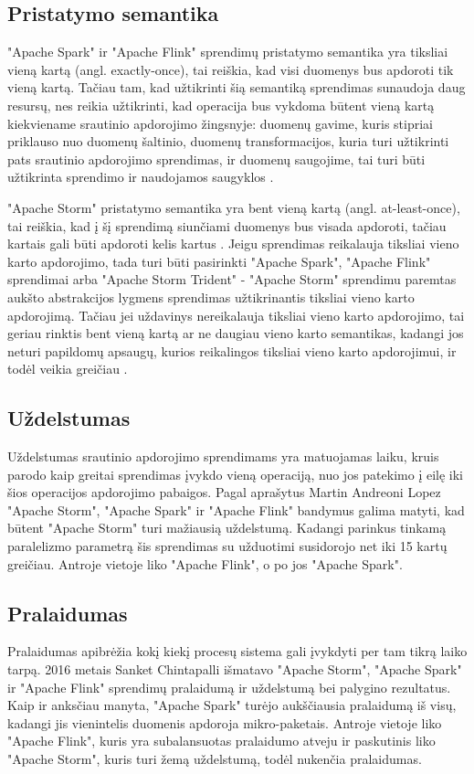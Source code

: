 \documentclass{VUMIFPSkursinis}
\begin{document}
\subsection{Pristatymo semantika}
"Apache Spark" ir "Apache Flink" sprendimų pristatymo semantika yra tiksliai vieną kartą (angl. exactly-once), tai reiškia, kad visi 
duomenys bus apdoroti tik vieną kartą. Tačiau tam, kad užtikrinti šią semantiką sprendimas sunaudoja daug resursų, nes reikia užtikrinti, kad 
operacija bus vykdoma būtent vieną kartą kiekviename srautinio apdorojimo žingsnyje: duomenų gavime, kuris stipriai priklauso nuo duomenų šaltinio,
duomenų transformacijos, kuria turi užtikrinti pats srautinio apdorojimo sprendimas, ir duomenų saugojime, tai turi būti užtikrinta sprendimo ir
naudojamos saugyklos \cite{zhang20}.\par
    "Apache Storm" pristatymo semantika yra bent vieną kartą (angl. at-least-once), tai reiškia, kad į šį sprendimą siunčiami duomenys 
bus visada apdoroti, tačiau kartais gali būti apdoroti kelis kartus \cite{prithi20}. Jeigu sprendimas reikalauja tiksliai vieno karto apdorojimo, tada turi būti pasirinkti
"Apache Spark", "Apache Flink" sprendimai arba "Apache Storm Trident" - "Apache Storm" sprendimu paremtas aukšto abstrakcijos lygmens sprendimas 
užtikrinantis tiksliai vieno karto apdorojimą. Tačiau jei uždavinys nereikalauja tiksliai vieno karto apdorojimo, tai geriau
rinktis bent vieną kartą ar ne daugiau vieno karto semantikas, kadangi jos neturi papildomų apsaugų, kurios reikalingos tiksliai vieno karto apdorojimui,
ir todėl veikia greičiau \cite{zhang20}.
\subsection{Uždelstumas}
    Uždelstumas srautinio apdorojimo sprendimams yra matuojamas laiku, kruis parodo kaip greitai sprendimas įvykdo vieną operaciją, nuo jos patekimo į eilę iki šios operacijos
    apdorojimo pabaigos. 
Pagal \cite{Lopez2016APC} aprašytus Martin Andreoni Lopez "Apache Storm", "Apache Spark" ir "Apache Flink" bandymus galima matyti, kad būtent "Apache Storm" turi mažiausią uždelstumą. 
Kadangi parinkus tinkamą paralelizmo parametrą šis sprendimas su užduotimi susidorojo net iki 15 kartų greičiau. Antroje vietoje liko "Apache Flink", o po jos
"Apache Spark".

\subsection{Pralaidumas}
Pralaidumas apibrėžia kokį kiekį procesų sistema gali įvykdyti per tam tikrą laiko tarpą. 2016 metais Sanket Chintapalli \cite{chintapalli2016benchmarking} išmatavo "Apache Storm",
"Apache Spark" ir "Apache Flink" sprendimų pralaidumą ir uždelstumą bei palygino rezultatus. Kaip ir anksčiau manyta, "Apache Spark" turėjo aukščiausia 
pralaidumą iš visų, kadangi jis vienintelis duomenis apdoroja mikro-paketais. Antroje vietoje liko "Apache Flink", kuris yra subalansuotas
pralaidumo atveju ir paskutinis liko "Apache Storm", kuris turi žemą uždelstumą, todėl nukenčia pralaidumas.
\end{document}

